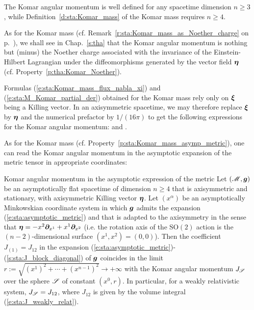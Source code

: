 \begin{remark}
The Komar angular momentum is well defined for any spacetime dimension $n\geq 3$, while
Definition~\ref{d:sta:Komar_mass} of the Komar mass requires
$n\geq 4$.
\end{remark}

\begin{remark}
As for the Komar mass (cf. Remark~\ref{r:sta:Komar_mass_as_Noether_charge} on p.~\pageref{r:sta:Komar_mass_as_Noether_charge}), we shall see in Chap.~\ref{s:tha} that the
Komar angular momentum is nothing but (minus) the Noether charge associated with
the invariance of the Einstein-Hilbert Lagrangian
under the diffeomorphisms generated by the vector field $\bm{\eta}$ (cf. Property~\ref{p:tha:Komar_Noether}).
\end{remark}

Formulas (\ref{e:sta:Komar_mass_flux_nabla_xi}) and (\ref{e:sta:M_Komar_partial_der})
obtained for the Komar mass rely only on $\bm{\xi}$ being a Killing vector.
In an axisymmetric spacetime, we may therefore replace $\bm{\xi}$ by $\bm{\eta}$
and the numerical prefactor by $1/(16\pi)$ to get the following expressions
for the Komar angular momentum:
\be \label{e:sta:J_Komar_cov_der}
\ee
and
\be \label{e:sta:J_Komar_partial_der}
     .
\ee

As for the Komar mass (cf. Property~\ref{p:sta:Komar_mass_asymp_metric}), one can read the
Komar angular momentum in the asymptotic expansion of the metric tensor in appropriate coordinates:

\begin{tprop}{Komar angular momentum in the asymptotic expression of the metric}{}
Let $(\mathscr{M},\bm{g})$ be an asymptotically flat spacetime of dimension $n\geq 4$ that is axisymmetric
and stationary, with axisymmetric Killing vector $\bm{\eta}$.
Let $(x^\alpha)$ be an asymptotically Minkowskian coordinate system
in which $\bm{g}$ admits the expansion (\ref{e:sta:asymptotic_metric})
and that is adapted to the axisymmetry in the sense
that $\bm{\eta} = - x^2 \bm{\partial}_{x^1} + x^1 \bm{\partial}_{x^2}$
(i.e. the rotation axis of the $\mathrm{SO}(2)$ action
is the $(n-2)$-dimensional surface $(x^1,x^2) = (0,0)$).
Then the coefficient $J_{(1)} = J_{12}$ in the expansion
(\ref{e:sta:asymptotic_metric})-(\ref{s:sta:J_block_diagonal}) of $\bm{g}$
coincides in the limit $r := \sqrt{(x^1)^2 + \cdots + (x^{n-1})^2} \to +\infty$ with
the Komar angular momentum $J_{\mathscr{S}}$ over the sphere $\mathscr{S}$
of constant $(x^0,r)$.
In particular, for a weakly relativistic system, $J_{\mathscr{S}} = J_{12}$,
where $J_{12}$ is given by the volume integral (\ref{e:sta:J_weakly_relat}).
\end{tprop}

